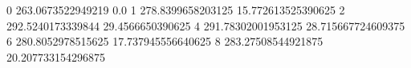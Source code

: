 0 263.0673522949219 0.0
1 278.8399658203125 15.772613525390625
2 292.5240173339844 29.4566650390625
4 291.78302001953125 28.715667724609375
6 280.8052978515625 17.737945556640625
8 283.27508544921875 20.207733154296875

